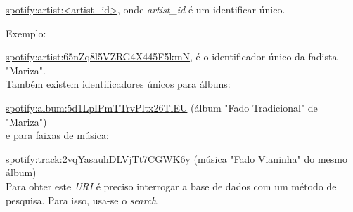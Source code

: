       \url{spotify:artist:<artist_id>}, onde \emph{artist\_id} é um identificar único.

      Exemplo:

      \url{spotify:artist:65nZq8l5VZRG4X445F5kmN}, é o identificador único da fadista "Mariza". \\

      Também existem identificadores únicos para álbuns:

      \url{spotify:album:5d1LpIPmTTrvPltx26TlEU} (álbum "Fado Tradicional" de "Mariza") \\

       e para faixas de música:

       \url{spotify:track:2vqYasauhDLVjTt7CGWK6y} (música "Fado Vianinha" do mesmo álbum) \\

      Para obter este \emph{URI} é preciso interrogar a base de dados com um método de pesquisa.
      Para isso, usa-se o \emph{search}.

